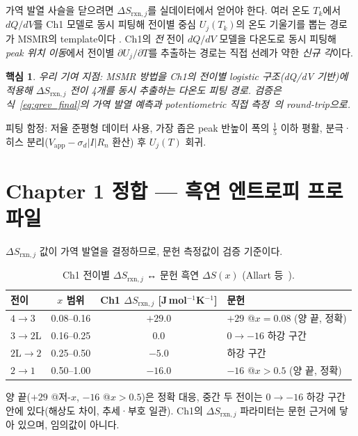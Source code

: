 \documentclass[11pt,a4paper]{article}
\newtheorem*{keybox}{핵심}
\newcommand{\rxn}{\mathrm{rxn}}
\begin{document}
가역 발열 사슬을 닫으려면 $\Delta S_{\rxn,j}$를 실데이터에서 얻어야 한다.
여러 온도 $T_k$에서 $dQ/dV$를 Ch1 모델로 동시 피팅해
전이별 중심 $U_j(T_k)$의 온도 기울기를 뽑는 경로가 MSMR의 template이다
\cite{msmr_partI,msmr_partII}.
Ch1의 \emph{전} 전이 $dQ/dV$ 모델을 다온도로 동시 피팅해
\emph{peak 위치 이동}에서 전이별 $\partial U_j/\partial T$를 추출하는 경로는
직접 선례가 약한 \emph{신규 각}이다.

\begin{keybox}
우리 기여 지점: MSMR 방법을 Ch1의 전이별 logistic 구조(dQ/dV 기반)에
적용해 $\Delta S_{\rxn,j}$ 전이 4개를 동시 추출하는 다온도 피팅 경로.
검증은 식~\eqref{eq:qrev_final}의 가역 발열 예측과
potentiometric 직접 측정~\cite{standardised2024}의 round-trip으로.
\end{keybox}

피팅 함정: 저율 준평형 데이터 사용, 가장 좁은 peak 반높이 폭의 $\frac{1}{5}$ 이하 평활,
분극·히스 분리($V_{\mathrm{app}}-\sigma_d|I|R_n$ 환산) 후 $U_j(T)$ 회귀.

\section{Chapter 1 정합 --- 흑연 엔트로피 프로파일}\label{sec:ch1_match}

$\Delta S_{\rxn,j}$ 값이 가역 발열을 결정하므로, 문헌 측정값이 검증 기준이다.

\begin{table}[h]
\centering\small\renewcommand{\arraystretch}{1.2}
\caption{Ch1 전이별 $\Delta S_{\rxn,j}$ ↔ 문헌 흑연 $\Delta S(x)$ (Allart 등~\cite{allart2018}).}
\label{tab:ds}
\begin{tabular}{lccl}
\toprule
전이 & $x$ 범위 & Ch1 $\Delta S_{\rxn,j}$ [J\,mol$^{-1}$K$^{-1}$] & 문헌 \\
\midrule
$4\to3$     & 0.08--0.16 & $+29.0$ & $+29$ @$x=0.08$ (양 끝, 정확) \\
$3\to2$L    & 0.16--0.25 & $0.0$   & $0\to{-16}$ 하강 구간 \\
$2$L$\to2$  & 0.25--0.50 & $-5.0$  & 하강 구간 \\
$2\to1$     & 0.50--1.00 & $-16.0$ & $-16$ @$x>0.5$ (양 끝, 정확) \\
\bottomrule
\end{tabular}
\end{table}

양 끝($+29$ @저-$x$, $-16$ @$x>0.5$)은 정확 대응,
중간 두 전이는 $0\to-16$ 하강 구간 안에 있다(해상도 차이, 추세·부호 일관).
Ch1의 $\Delta S_{\rxn,j}$ 파라미터는 문헌 근거에 닿아 있으며, 임의값이 아니다.
\end{document}
